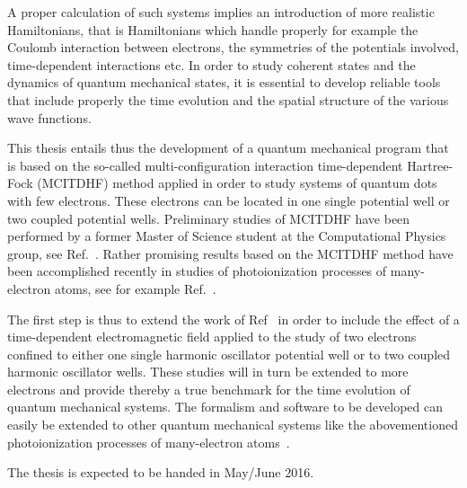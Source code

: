 A proper calculation of such systems implies an introduction of more 
realistic Hamiltonians, that is Hamiltonians which handle properly for example the Coulomb interaction between electrons, the symmetries of the potentials involved, time-dependent interactions etc. 
In order to study coherent states and the dynamics of quantum mechanical states, it is essential to develop reliable tools that include properly the time evolution and the spatial structure of the various wave functions. 


This thesis 
entails thus the development of a quantum mechanical program that is based on the so-called multi-configuration interaction time-dependent Hartree-Fock (MCITDHF) method applied in order to study systems
of quantum dots with few electrons. These electrons can be located in one single potential well or two coupled potential wells. Preliminary studies of
MCITDHF have been performed by a former Master of Science student at the Computational Physics group, see Ref.~\cite{Skattum2013}.
Rather promising results based on the MCITDHF method have been accomplished recently in studies of photoionization processes of many-electron atoms, see for example Ref.~\cite{Hochstuhl2014}.

The first step is thus to extend the work of Ref~\cite{Skattum2013} in order to include the effect of a time-dependent electromagnetic field applied to the study of two electrons confined to either one single harmonic oscillator potential well or to two coupled harmonic oscillator wells. These studies will in turn be extended to more electrons and provide thereby a true benchmark for the time evolution of quantum mechanical systems. The formalism and software to be developed can easily be extended to other quantum mechanical systems like the abovementioned  photoionization processes of many-electron atoms~\cite{Hochstuhl2014}.


The thesis is expected to be handed in May/June 2016.

